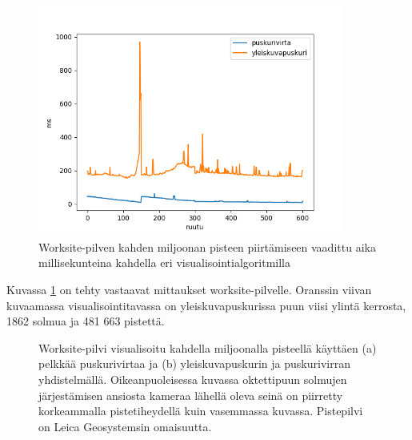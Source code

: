 \begin{figure}[h]
    \centering
    \includegraphics[width=0.9\textwidth]{tuloksia/worksite_ms_per_frame.png}
    \caption{Worksite-pilven kahden miljoonan pisteen piirtämiseen vaadittu aika millisekunteina kahdella eri visualisointialgoritmilla}
    \label{ws_ms}
\end{figure}

Kuvassa \ref{ws_ms} on tehty vastaavat mittaukset worksite-pilvelle. Oranssin viivan kuvaamassa visualisointitavassa on yleiskuvapuskurissa puun viisi ylintä kerrosta, 1862 solmua ja 481 663 pistettä.

\begin{figure}
    \caption{Worksite-pilvi visualisoitu kahdella miljoonalla pisteellä käyttäen (a) pelkkää puskurivirtaa ja (b) yleiskuvapuskurin ja puskurivirran yhdistelmällä. Oikeanpuoleisessa kuvassa oktettipuun solmujen järjestämisen ansiosta kameraa lähellä oleva seinä on piirretty korkeammalla pistetiheydellä kuin vasemmassa kuvassa. Pistepilvi on Leica Geosystemsin omaisuutta.}
    \label{img:worksite_vertailu}
\end{figure}

